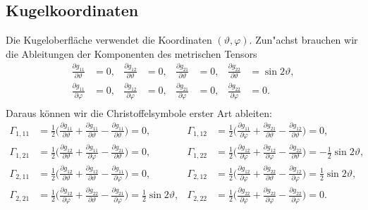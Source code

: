 \subsection{Kugelkoordinaten}
Die Kugeloberfläche verwendet die Koordinaten $(\vartheta,\varphi)$.
Zun"achst brauchen wir die Ableitungen der Komponenten des metrischen
Tensors
\begin{align*}
\frac{\partial g_{11}}{\partial \vartheta} &=0,
&
\frac{\partial g_{12}}{\partial \vartheta} &=0,
&
\frac{\partial g_{21}}{\partial \vartheta} &=0,
&
\frac{\partial g_{22}}{\partial \vartheta} &=\sin2\vartheta,
\\
\frac{\partial g_{11}}{\partial \varphi} &=0,
&
\frac{\partial g_{12}}{\partial \varphi} &=0,
&
\frac{\partial g_{21}}{\partial \varphi} &=0,
&
\frac{\partial g_{22}}{\partial \varphi} &=0.
\\
\end{align*}
Daraus können wir die Christoffelsymbole erster Art ableiten:
\begin{align*}
 \Gamma_{1,11}
&=
\frac12\biggl(\frac{\partial g_{11}}{\partial \vartheta}
	+ \frac{\partial g_{11}}{\partial \vartheta}
	- \frac{\partial g_{11}}{\partial \vartheta}\biggr)=0,
&\Gamma_{1,12}
&=
\frac12\biggl(\frac{\partial g_{11}}{\partial \varphi}
	+ \frac{\partial g_{21}}{\partial \vartheta}
	- \frac{\partial g_{12}}{\partial \vartheta}\biggr)=0,
\\
\Gamma_{1,21}
&=
\frac12\biggl(\frac{\partial g_{12}}{\partial \vartheta}
	+ \frac{\partial g_{11}}{\partial \varphi}
	- \frac{\partial g_{21}}{\partial \vartheta}\biggr)=0,
&\Gamma_{1,22}
&=
\frac12\biggl(\frac{\partial g_{12}}{\partial \varphi}
	+ \frac{\partial g_{12}}{\partial \varphi}
	- \frac{\partial g_{22}}{\partial \vartheta}\biggr)=-\frac12\sin2\vartheta,
\\
\Gamma_{2,11}
&=
\frac12\biggl(\frac{\partial g_{12}}{\partial \vartheta}
	+ \frac{\partial g_{12}}{\partial \vartheta}
	- \frac{\partial g_{11}}{\partial \varphi}\biggr)=0,
&\Gamma_{2,12}
&=
\frac12\biggl(\frac{\partial g_{12}}{\partial \varphi}
	+ \frac{\partial g_{22}}{\partial \vartheta}
	- \frac{\partial g_{12}}{\partial \varphi}\biggr)=\frac12\sin2\vartheta,
\\
\Gamma_{2,21}
&=
\frac12\biggl(\frac{\partial g_{12}}{\partial \varphi}
	+ \frac{\partial g_{22}}{\partial \vartheta}
	- \frac{\partial g_{21}}{\partial \varphi}\biggr)=\frac12\sin2\vartheta,
&\Gamma_{2,22}
&=
\frac12\biggl(\frac{\partial g_{22}}{\partial \varphi}
	+ \frac{\partial g_{22}}{\partial \varphi}
	- \frac{\partial g_{22}}{\partial \varphi}\biggr)=0.
\end{align*}
